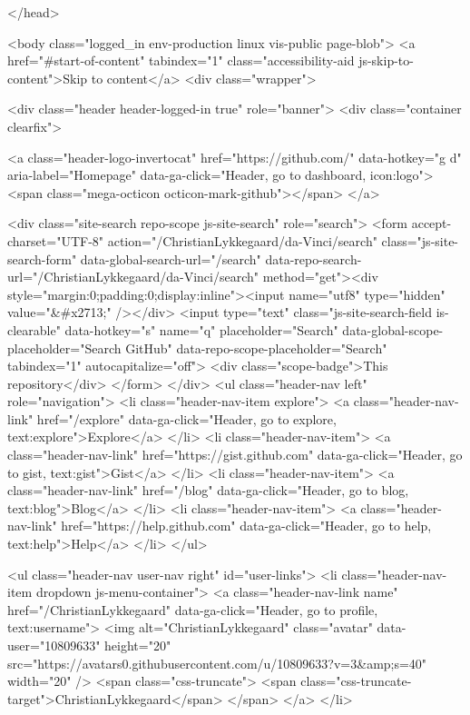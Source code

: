   </head>


  <body class="logged_in  env-production linux vis-public page-blob">
    <a href="#start-of-content" tabindex="1" class="accessibility-aid js-skip-to-content">Skip to content</a>
    <div class="wrapper">
      
      
      
      


      <div class="header header-logged-in true" role="banner">
  <div class="container clearfix">

    <a class="header-logo-invertocat" href="https://github.com/" data-hotkey="g d" aria-label="Homepage" data-ga-click="Header, go to dashboard, icon:logo">
  <span class="mega-octicon octicon-mark-github"></span>
</a>


      <div class="site-search repo-scope js-site-search" role="search">
          <form accept-charset="UTF-8" action="/ChristianLykkegaard/da-Vinci/search" class="js-site-search-form" data-global-search-url="/search" data-repo-search-url="/ChristianLykkegaard/da-Vinci/search" method="get"><div style="margin:0;padding:0;display:inline"><input name="utf8" type="hidden" value="&#x2713;" /></div>
  <input type="text"
    class="js-site-search-field is-clearable"
    data-hotkey="s"
    name="q"
    placeholder="Search"
    data-global-scope-placeholder="Search GitHub"
    data-repo-scope-placeholder="Search"
    tabindex="1"
    autocapitalize="off">
  <div class="scope-badge">This repository</div>
</form>
      </div>
      <ul class="header-nav left" role="navigation">
        <li class="header-nav-item explore">
          <a class="header-nav-link" href="/explore" data-ga-click="Header, go to explore, text:explore">Explore</a>
        </li>
          <li class="header-nav-item">
            <a class="header-nav-link" href="https://gist.github.com" data-ga-click="Header, go to gist, text:gist">Gist</a>
          </li>
          <li class="header-nav-item">
            <a class="header-nav-link" href="/blog" data-ga-click="Header, go to blog, text:blog">Blog</a>
          </li>
        <li class="header-nav-item">
          <a class="header-nav-link" href="https://help.github.com" data-ga-click="Header, go to help, text:help">Help</a>
        </li>
      </ul>

    
<ul class="header-nav user-nav right" id="user-links">
  <li class="header-nav-item dropdown js-menu-container">
    <a class="header-nav-link name" href="/ChristianLykkegaard" data-ga-click="Header, go to profile, text:username">
      <img alt="ChristianLykkegaard" class="avatar" data-user="10809633" height="20" src="https://avatars0.githubusercontent.com/u/10809633?v=3&amp;s=40" width="20" />
      <span class="css-truncate">
        <span class="css-truncate-target">ChristianLykkegaard</span>
      </span>
    </a>
  </li>

